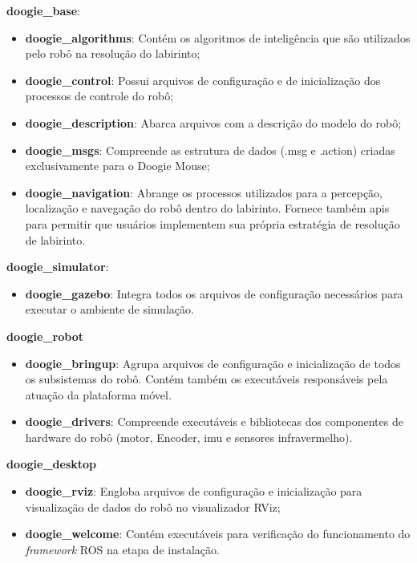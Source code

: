 \textbf{doogie\_base}:
\begin{itemize}
	\item \textbf{doogie\_algorithms}: Contém os algoritmos de inteligência que são utilizados pelo robô na resolução do labirinto;
	\item \textbf{doogie\_control}: Possui arquivos de configuração e de inicialização dos processos de controle do robô;
	\item \textbf{doogie\_description}: Abarca arquivos com a descrição do modelo do robô;
	\item \textbf{doogie\_msgs}: Compreende as estrutura de dados (.msg e .action) criadas exclusivamente para o Doogie Mouse;
	\item \textbf{doogie\_navigation}: Abrange os processos utilizados para a percepção, localização e navegação do robô dentro do labirinto. Fornece também \glspl*{api} para permitir que usuários implementem sua própria estratégia de resolução de labirinto.   
\end{itemize}
	
\textbf{doogie\_simulator}:
\begin{itemize}
	\item \textbf{doogie\_gazebo}: Integra todos os arquivos de configuração necessários para executar o ambiente de simulação.
\end{itemize}
	
\textbf{doogie\_robot}
\begin{itemize}
	\item \textbf{doogie\_bringup}: Agrupa arquivos de configuração e inicialização de todos os subsistemas do robô. Contém também os executáveis responsáveis pela atuação da plataforma móvel.  
	\item \textbf{doogie\_drivers}: Compreende executáveis e bibliotecas dos componentes de hardware do robô (motor, Encoder, \gls*{imu} e sensores infravermelho).
\end{itemize}
	
\textbf{doogie\_desktop}
\begin{itemize}
	\item \textbf{doogie\_rviz}: Engloba arquivos de configuração e inicialização para visualização de dados do robô no visualizador RViz;
	\item \textbf{doogie\_welcome}: Contém executáveis para verificação do funcionamento do \textit{framework} ROS na etapa de instalação.
\end{itemize}


